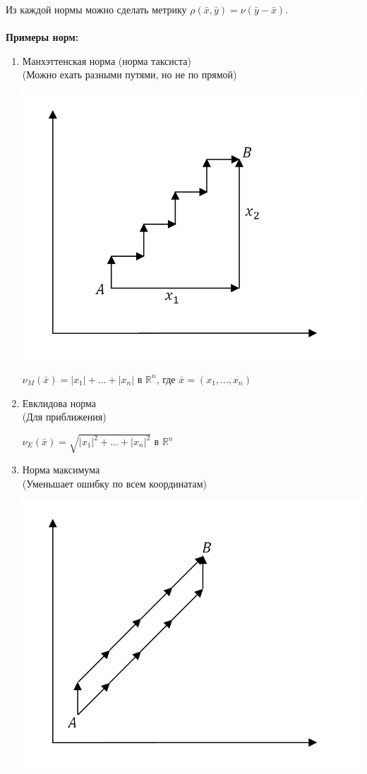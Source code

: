 \documentclass[a4paper,12pt]{article}
\begin{document}
\begin{defintion}
Из каждой нормы можно сделать метрику $\rho(\bar x, \bar y) = \nu(\bar y - \bar x)$.\\ \\
\textbf{Примеры норм:}\begin{enumerate}
	\item Манхэттенская норма (норма таксиста)\\
	(Можно ехать разными путями, но не по прямой)\begin{center}
		\includegraphics[scale=0.4]{l4_7.png}\end{center}
	\begin{center}$\nu_M(\bar x) = |x_1|+...+|x_n|$ в $\mathbb{R}^n$, где $\bar x = (x_1,..., x_n)$\end{center}
	\item Евклидова норма\\
	(Для приближения)
	\begin{center}
		$\nu_E(\bar x) = \sqrt{|x_1|^2+...+|x_n|^2}$ в $\mathbb{R}^n$\end{center}
	\item Норма максимума\\
	(Уменьшает ошибку по всем координатам)\begin{center}
		\includegraphics[scale=0.4]{l4_8.png}\end{center}

\end{enumerate}
\end{defintion}
\end{document}
